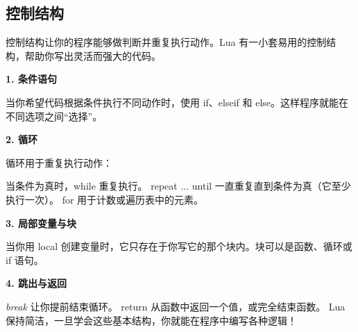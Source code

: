 \subsection{控制结构}


控制结构让你的程序能够做判断并重复执行动作。Lua 有一小套易用的控制结构，帮助你写出灵活而强大的代码。

\textbf{1. 条件语句}

当你希望代码根据条件执行不同动作时，使用 if、elseif 和 else。这样程序就能在不同选项之间“选择”。

\textbf{2. 循环}

循环用于重复执行动作：

当条件为真时，while 重复执行。
repeat ... until 一直重复直到条件为真（它至少执行一次）。
for 用于计数或遍历表中的元素。

\textbf{3. 局部变量与块}

当你用 local 创建变量时，它只存在于你写它的那个块内。块可以是函数、循环或 if 语句。

\textbf{4. 跳出与返回}

\emph{break} 让你提前结束循环。
return 从函数中返回一个值，或完全结束函数。
Lua 保持简洁，一旦学会这些基本结构，你就能在程序中编写各种逻辑！

